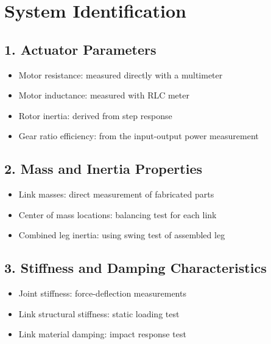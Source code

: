 \documentclass[12pt]{article}
\begin{document}





\section*{System Identification}


\subsection*{1. Actuator Parameters}
\begin{itemize}
    \item Motor resistance: measured directly with a multimeter
    \item Motor inductance: measured with RLC meter
    \item Rotor inertia: derived from step response
    \item Gear ratio efficiency: from the input-output power measurement
\end{itemize}

\subsection*{2. Mass and Inertia Properties}
\begin{itemize}
    \item Link masses: direct measurement of fabricated parts
    \item Center of mass locations: balancing test for each link
    \item Combined leg inertia: using swing test of assembled leg
\end{itemize}

\subsection*{3. Stiffness and Damping Characteristics}
\begin{itemize}
    \item Joint stiffness: force-deflection measurements
    \item Link structural stiffness: static loading test
    \item Link material damping: impact response test
\end{itemize}
\end{document}
